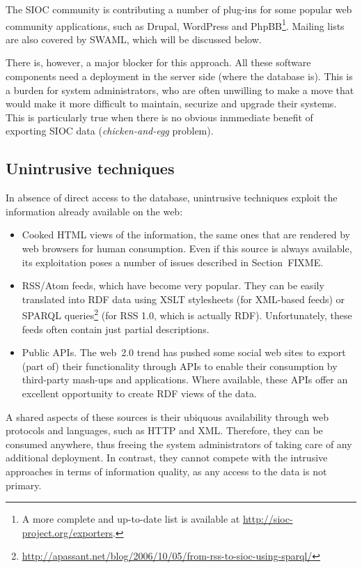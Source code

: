 \documentclass{../templates/www2008-submission}
\begin{document}
The SIOC community is contributing a number of plug-ins for some
popular web community applications, such as Drupal, WordPress and 
PhpBB\footnote{A more complete and up-to-date list is available
at \url{http://sioc-project.org/exporters}.}. Mailing lists are
also covered by SWAML, which will be discussed below.

There is, however, a major blocker for this approach. All these
software components need a deployment in the server side (where
the database is). This is a burden for system administrators, who
are often unwilling to make a move that would make it more difficult to
maintain, securize and upgrade their systems. This is particularly
true when there is no obvious inmmediate benefit of exporting
SIOC data (\emph{chicken-and-egg} problem).

\subsection{Unintrusive techniques}

In absence of direct access to the database, unintrusive
techniques exploit the information already available on the web:

\begin{itemize}

\item Cooked HTML views of the information, the same ones that
are rendered by web browsers for human consumption.
Even if this source is always available,
its exploitation poses a number of issues described in Section~FIXME.

\item RSS/Atom feeds, which have become very popular. They can be easily
translated into RDF data using XSLT stylesheets (for XML-based feeds) or SPARQL queries\footnote{\url{http://apassant.net/blog/2006/10/05/from-rss-to-sioc-using-sparql/}}
(for RSS 1.0, which is actually RDF). Unfortunately,
these feeds often contain just partial descriptions.

\item Public APIs. The web~2.0 trend has pushed some social web
sites to export (part of) their functionality through APIs
to enable their consumption by third-party mash-ups and applications.
Where available, these APIs offer an excellent opportunity to
create RDF views of the data.

\end{itemize}

A shared aspects of these sources is their ubiquous availability through
web protocols and languages, such as HTTP and XML. Therefore, they
can be consumed anywhere, thus freeing the system administrators of
taking care of any additional deployment. In contrast, they cannot compete
with the intrusive approaches in terms of information quality, as
any access to the data is not primary.
\end{document}
